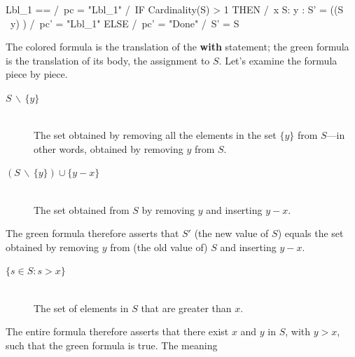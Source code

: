 \documentclass[fleqn,leqno]{article}
\begin{document}
\begin{display}
\begin{notla}
Lbl_1 == /\ pc = "Lbl_1"
         /\ IF Cardinality(S) > 1
               THEN /\ \E x \in S:
                         \E y :
                           S' = ((S \ {y}) )
                    /\ pc' = "Lbl_1"
               ELSE /\ pc' = "Done"
                    /\ S' = S
\end{notla}
\begin{tlatex} %
{}%
%
%
%
%
%
\end{tlatex}
\end{display}
The colored formula is the translation of the \textbf{with} statement;
the green formula is the translation of its body, the assignment to $S$.
Let's examine the formula piece by piece.
\begin{description}
\item[\darkgreen$S \,\backslash\, \{y\}$] \mbox{}\\
The set obtained by removing all the
elements in the set $\{y\}$ from $S$---in other words, obtained by
removing $y$ from $S$.

\item[\darkgreen$(S \,\backslash\, \{y\})\cup \{y - x\}$] \mbox{}\\
The set obtained from $S$ by removing $y$ and inserting $y-x$.
\end{description}
The green formula therefore asserts that $S'$ (the new value of $S$)
equals the set obtained by removing $y$ from (the old value of) $S$
and inserting $y-x$.
\begin{description}
\item[\red$\{s \in S : s > x\}$] \mbox{}\\ 
The set of elements in $S$
that are greater than $x$.
\end{description}
The entire formula therefore asserts that there exist $x$ and $y$ in
$S$, with $y>x$, such that the green formula is true.  
The meaning
\end{document}
